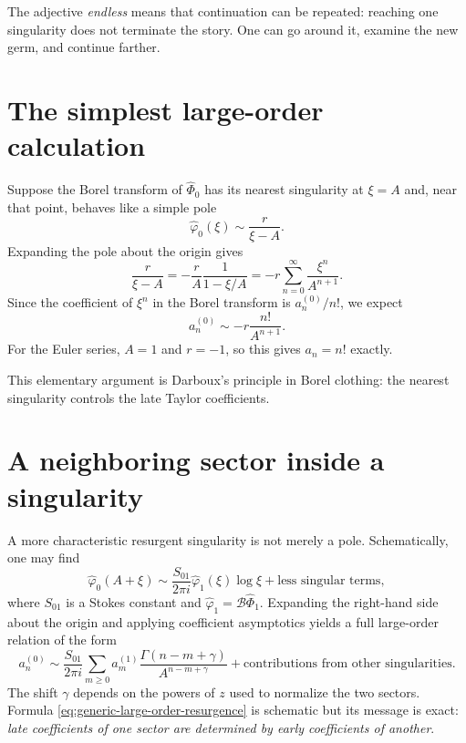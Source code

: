 \documentclass[11pt,oneside]{book}
\theoremstyle{definition}
\theoremstyle{remark}
\newcommand{\Borel}{\mathcal{B}}
\newcommand{\phihat}{\widehat{\Phi}}
\begin{document}
The adjective \emph{endless} means that continuation can be repeated: reaching
one singularity does not terminate the story. One can go around it, examine the
new germ, and continue farther.

\section{The simplest large-order calculation}

Suppose the Borel transform of $\phihat_0$ has its nearest singularity at
$\xi=A$ and, near that point, behaves like a simple pole
\begin{equation}
  \widehat\varphi_0(\xi)
  \sim \frac{r}{\xi-A}.
  \label{eq:simple-borel-pole}
\end{equation}
Expanding the pole about the origin gives
\[
  \frac{r}{\xi-A}
  =-\frac{r}{A}\frac1{1-\xi/A}
  =-r\sum_{n=0}^{\infty}\frac{\xi^n}{A^{n+1}}.
\]
Since the coefficient of $\xi^n$ in the Borel transform is
$a_n^{(0)}/n!$, we expect
\begin{equation}
  a_n^{(0)}\sim-r\frac{n!}{A^{n+1}}.
  \label{eq:simple-pole-large-order}
\end{equation}
For the Euler series, $A=1$ and $r=-1$, so this gives $a_n=n!$ exactly.

This elementary argument is Darboux's principle in Borel clothing: the nearest
singularity controls the late Taylor coefficients.

\section{A neighboring sector inside a singularity}

A more characteristic resurgent singularity is not merely a pole. Schematically,
one may find
\begin{equation}
  \widehat\varphi_0(A+\xi)
  \sim
  \frac{S_{01}}{2\pi i}
  \widehat\varphi_1(\xi)\log\xi
  +\text{less singular terms},
  \label{eq:resurgent-local-model}
\end{equation}
where $S_{01}$ is a Stokes constant and
$\widehat\varphi_1=\Borel\phihat_1$. Expanding the right-hand side about the
origin and applying coefficient asymptotics yields a full large-order relation
of the form
\begin{equation}
  a_n^{(0)}
  \sim \frac{S_{01}}{2\pi i}
  \sum_{m\ge0}a_m^{(1)}
  \frac{\Gamma(n-m+\gamma)}{A^{n-m+\gamma}}
  +\text{contributions from other singularities}.
  \label{eq:generic-large-order-resurgence}
\end{equation}
The shift $\gamma$ depends on the powers of $z$ used to normalize the two
sectors. Formula \eqref{eq:generic-large-order-resurgence} is schematic but its
message is exact: \emph{late coefficients of one sector are determined by early
coefficients of another}.
\end{document}
